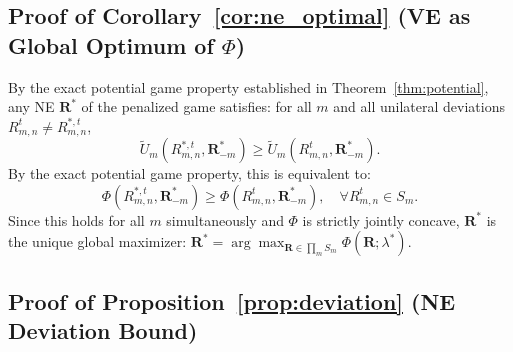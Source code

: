 \documentclass[journal]{IEEEtran}
\newcommand{\bfR}{\mathbf{R}}
\begin{document}
\subsection{Proof of Corollary~\ref{cor:ne_optimal}
(VE as Global Optimum of $\Phi$)}

\begin{IEEEproof}
By the exact potential game property established in Theorem~\ref{thm:potential}, any NE $\bfR^*$ of the penalized game satisfies: for all $m$ and all unilateral deviations $R_{m,n}^t \neq R_{m,n}^{*,t}$,
\begin{equation}
    \tilde{U}_m(R_{m,n}^{*,t}, \bfR_{-m}^*)
    \geq
    \tilde{U}_m(R_{m,n}^t, \bfR_{-m}^*).
\end{equation}
By the exact potential game property, this is equivalent to:
\begin{equation}
    \Phi(R_{m,n}^{*,t}, \bfR_{-m}^*)
    \geq
    \Phi(R_{m,n}^t, \bfR_{-m}^*),
    \quad \forall R_{m,n}^t \in S_m.
\end{equation}
Since this holds for all $m$ simultaneously and $\Phi$ is strictly jointly concave, $\bfR^*$ is the unique global maximizer: $\bfR^* = \arg\max_{\bfR \in \prod_m S_m}
\Phi(\bfR; \lambda^*)$.

\end{IEEEproof}

\subsection{Proof of Proposition~\ref{prop:deviation}
(NE Deviation Bound)}
\end{document}

